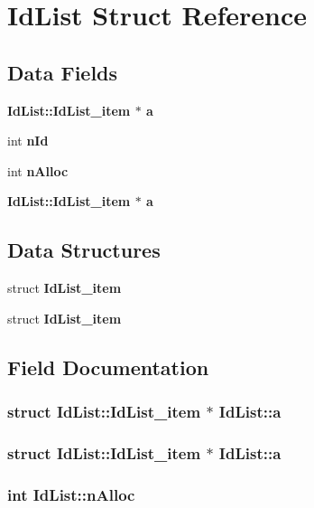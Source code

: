 \section{Id\-List Struct Reference}
\label{structIdList}
\subsection*{Data Fields}
\begin{CompactItemize}
\item 
\bf{Id\-List::Id\-List\_\-item} $\ast$ \bf{a}
\item 
int \bf{n\-Id}
\item 
int \bf{n\-Alloc}
\item 
\bf{Id\-List::Id\-List\_\-item} $\ast$ \bf{a}
\end{CompactItemize}
\subsection*{Data Structures}
\begin{CompactItemize}
\item 
struct \bf{Id\-List\_\-item}
\item 
struct \bf{Id\-List\_\-item}
\end{CompactItemize}


\subsection{Field Documentation}
\subsubsection{\setlength{\rightskip}{0pt plus 5cm}struct \bf{Id\-List::Id\-List\_\-item} $\ast$ \bf{Id\-List::a}}\label{structIdList_8ee9b2dacff36b05a295e6b661778f43}


\subsubsection{\setlength{\rightskip}{0pt plus 5cm}struct \bf{Id\-List::Id\-List\_\-item} $\ast$ \bf{Id\-List::a}}\label{structIdList_8ee9b2dacff36b05a295e6b661778f43}


\subsubsection{\setlength{\rightskip}{0pt plus 5cm}int \bf{Id\-List::n\-Alloc}}\label{structIdList_e09a68d51c9e46e34d694ca77695d439}


